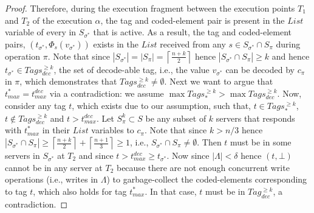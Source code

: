 \begin{proof}
Therefore, during the execution fragment between the execution points $T_1$ and $T_2$ of the execution $\alpha$, the tag and coded-element pair is present in the $List$ variable of every in $S_{\sigma^*}$ that is active. As a result, the tag and coded-element pairs, $(t_{\sigma^*}, \Phi_s(v_{\sigma^*}))$ exists in the $List$ received from any $s \in S_{\sigma^*} \cap S_{\pi}$ during operation $\pi$. Note that since $|S_{\sigma^*}| = |S_{\pi}| =\left\lceil \frac{n+k}{2} \right \rceil $ hence $|S_{\sigma^*} \cap S_{\pi} | \geq k$ and hence 
$t_{\sigma^*} \in Tags_{dec}^{\geq k} $, the set of decode-able tag, i.e., the value $v_{\sigma^*}$ can be decoded by $c_{\pi}$ in $\pi$, which demonstrates that $Tags_{dec}^{\geq k}  \neq \emptyset$. Next we want to argue that 
$t_{max}^* = t_{max}^{dec}$ via a contradiction: we assume  $ \max Tags_{*}^{\geq k}  >  \max Tags_{dec}^{\geq k}  $. Now, consider any tag $t$, which  exists due to our assumption,  such that,  $t \in Tags_{*}^{\geq k} $,  $t \not\in Tags_{dec}^{\geq k} $ and $t > t_{max}^{dec}$.
Let $S^k_{\pi} \subset S$ be any subset of $k$ servers that responds with $t^*_{max}$ in their $List$ variables to $c_{\pi}$. Note that since $k >  n/3$ hence $|S_{\sigma^*} \cap S_{\pi}|  \geq \left\lceil \frac{n+k}{2} \right \rceil +  \left\lceil \frac{n+1}{3} \right \rceil \geq 1$, i.e., $S_{\sigma^*} \cap S_{\pi} \neq \emptyset$. Then $t$  must be in some servers in $S_{\sigma^*}$ at $T_2$ and since $t > t_{max}^{dec} \geq t_{\sigma^*}$. 
Now since $|\Lambda| < \delta$ hence $(t, \bot)$ cannot be in any server at $T_2$  because there are not enough concurrent write operations (i.e., writes in $\Lambda$) to garbage-collect the coded-elements corresponding to tag $t$, which also holds  for tag  $t^{*}_{max}$. In that case, $t$ must be in $Tag_{dec}^{\geq k}$, a contradiction.
%
\end{proof}
